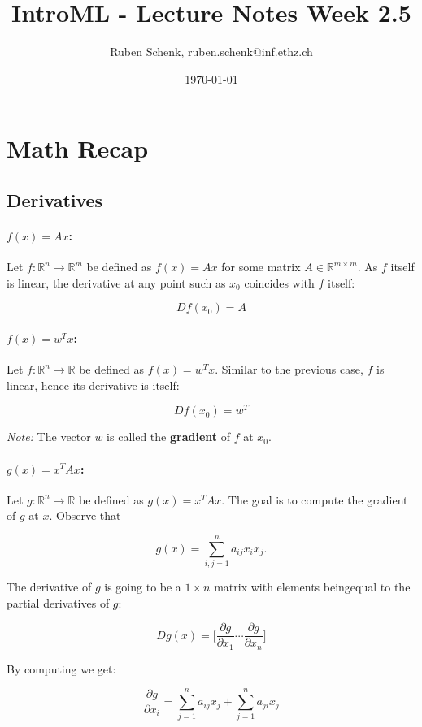\documentclass[a4paper]{extarticle}
\title{IntroML - Lecture Notes Week 2.5}
\author{Ruben Schenk, ruben.schenk@inf.ethz.ch}
\date{\today}
\begin{document}
\maketitle
\newpage

\section{Math Recap}

\subsection{Derivatives}

\paragraph{\(f(x) = Ax\):} Let \(f : \mathbb{R}^n \to \mathbb{R}^m\) be defined as \(f(x) = Ax\) for some matrix \(A \in \mathbb{R}^{m \times m}\). As \(f\) itself is linear, the derivative at any point such as \(x_0\) coincides with \(f\) itself:

\[
    Df(x_0) = A
\]

\paragraph{\(f(x) = w^Tx\):} Let \(f : \mathbb{R}^n \to \mathbb{R}\) be defined as \(f(x) = w^Tx\). Similar to the previous case, \(f\) is linear, hence its derivative is itself:

\[
    Df(x_0) = w^T
\]

\textit{Note:} The vector \(w\) is called the \textbf{gradient} of \(f\) at \(x_0\).

\paragraph{\(g(x) = x^TAx\):} Let \(g : \mathbb{R}^n \to \mathbb{R}\) be defined as \(g(x) = x^TAx\). The goal is to compute the gradient of \(g\) at \(x\). Observe that

\[
    g(x) = \sum_{i,j = 1}^n a_{ij}x_ix_j.
\]

The derivative of \(g\) is going to be a \(1 \times n\) matrix with elements beingequal to the partial derivatives of \(g\):

\[
    Dg(x) = \lbrack \frac{\partial g}{\partial x_1} \cdots \frac{\partial g}{\partial x_n} \rbrack
\]

By computing we get:

\[
    \frac{\partial g}{\partial x_i} = \sum_{j = 1}^n a_{ij}x_j + \sum_{j = 1}^n a_{ji}x_j
\]
\end{document}
